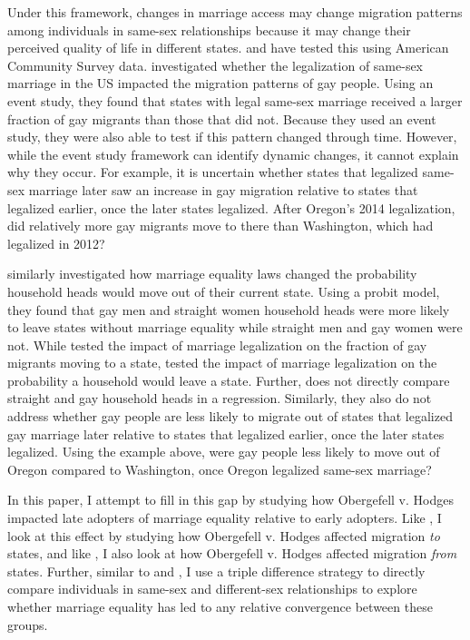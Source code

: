 \documentclass[12pt,letterpaper]{article}
\begin{document}
Under this framework, changes in marriage access may change migration patterns among individuals in same-sex relationships because it may change their perceived quality of life in different states. \citet{1} and \citet{12} have tested this using American Community Survey data. \citet{1} investigated whether the legalization of same-sex marriage in the US impacted the migration patterns of gay people. Using an event study, they found that states with legal same-sex marriage received a larger fraction of gay migrants than those that did not. Because they used an event study, they were also able to test if this pattern changed through time. However, while the event study framework can identify dynamic changes, it cannot explain why they occur. For example, it is uncertain whether states that legalized same-sex marriage later saw an increase in gay migration relative to states that legalized earlier, once the later states legalized. After Oregon’s 2014 legalization, did relatively more gay migrants move to there than Washington, which had legalized in 2012?

\citet{12} similarly investigated how marriage equality laws changed the probability household heads would move out of their current state. Using a probit model, they found that gay men and straight women household heads were more likely to leave states without marriage equality while straight men and gay women were not. While \citet{1} tested the impact of marriage legalization on the fraction of gay migrants moving to a state, \citet{12} tested the impact of marriage legalization on the probability a household would leave a state. Further, \citet{12} does not directly compare straight and gay household heads in a regression. Similarly, they also do not address whether gay people are less likely to migrate out of states that legalized gay marriage later relative to states that legalized earlier, once the later states legalized. Using the example above, were gay people less likely to move out of Oregon compared to Washington, once Oregon legalized same-sex marriage?

In this paper, I attempt to fill in this gap by studying how Obergefell v. Hodges impacted late adopters of marriage equality relative to early adopters. Like \citet{1}, I look at this effect by studying how Obergefell v. Hodges affected migration \textit{to} states, and like \citet{12}, I also look at how Obergefell v. Hodges affected migration \textit{from} states. Further, similar to \citet{3} and \citet{30}, I use a triple difference strategy to directly compare individuals in same-sex and different-sex relationships to explore whether marriage equality has led to any relative convergence between these groups.
\end{document}
